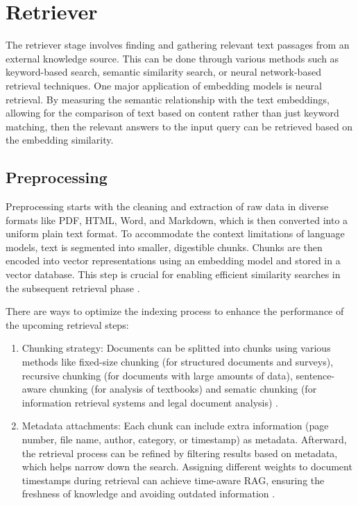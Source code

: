 \section{Retriever}

The retriever stage involves finding and gathering relevant text passages from an external knowledge source. This can be done through various methods such as keyword-based search, semantic similarity search, or neural network-based retrieval techniques.
One major application of embedding models is neural retrieval. By measuring the semantic relationship with the text embeddings, allowing for the comparison of text based on content rather than just keyword matching, then the relevant answers to the input query can be retrieved based on the embedding similarity.

\subsection{Preprocessing}
Preprocessing starts with the cleaning and extraction of raw data in diverse formats like PDF, HTML, Word, and Markdown, which is then converted into a uniform plain text format. To accommodate the context limitations of language models, text is segmented into smaller, digestible chunks. Chunks are then encoded into vector representations using an embedding model and stored in a vector database. This step is crucial for enabling efficient similarity searches in the subsequent retrieval phase \cite{gao2023ragllmsurvey}.

There are ways to optimize the indexing process to enhance the performance of the upcoming retrieval steps:
\begin{enumerate}
    \item Chunking strategy: Documents can be splitted into chunks using various methods like fixed-size chunking (for structured documents and surveys), recursive chunking (for documents with large amounts of data), sentence-aware chunking (for analysis of textbooks) and sematic chunking (for information retrieval systems and legal document analysis) \cite{kshirsagar2024chunking}.
    \item Metadata attachments: Each chunk can include extra information (page number, file name, author, category, or timestamp) as metadata. Afterward, the retrieval process can be refined by filtering results based on metadata, which helps narrow down the search. Assigning different weights to document timestamps during retrieval can achieve time-aware RAG, ensuring the freshness of knowledge and avoiding outdated information \cite{gao2023ragllmsurvey}.
\end{enumerate}

